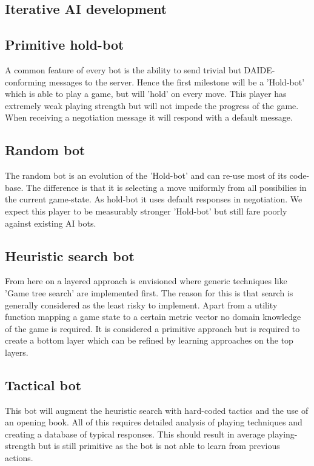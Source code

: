 \documentclass[12pt]{article}
\begin{document}
\begin{itemize}
{\section{Iterative AI development}

\subsection{Primitive hold-bot}
A common feature of every bot is the ability to send trivial but DAIDE-
conforming messages to the server. Hence the first milestone will
be a 'Hold-bot' which is able to play a game, but will 'hold' on
every move. This player has extremely weak playing strength but will
not impede the progress of the game. When receiving a negotiation
message it will respond with a default message.

\subsection{Random bot}
The random bot is an evolution of the 'Hold-bot' and can re-use most
of its code-base. The difference is that it is selecting a move
uniformly from all possibilies in the current game-state. As hold-bot it 
uses default responses in negotiation. We expect this player to be measurably
stronger 'Hold-bot' but still fare poorly against existing AI bots.

\subsection{Heuristic search bot}
From here on a layered approach is envisioned where generic techniques
like 'Game tree search' are implemented first. The reason for this is that 
search is generally considered as the least risky to implement. Apart from
a utility function mapping a game state to a certain metric vector no 
domain knowledge of the game is required. It is considered a primitive
approach but is required to create a bottom layer which can be refined
by learning approaches on the top layers.

\subsection{Tactical bot}
This bot will augment the heuristic search with hard-coded tactics and
the use of an opening book. All of this requires detailed analysis of 
playing techniques and creating a database of typical responses. This should
result in average playing-strength but is still primitive as the bot is not
able to learn from previous actions.

}
\end{itemize}
\end{document}
